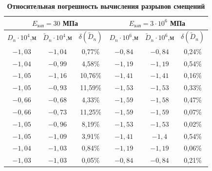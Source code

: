 \begin{table}[b!]

\centering \small 

\setlength{\extrarowheight}{3pt}

\setlength{\tabcolsep}{5pt} 

\caption*{\bf Относительная погрешность вычисления разрывов смещений}

\vspace{-3mm}  \small 

\begin{tabular}{c|c|c|c|c|c}

\hline 

  \multicolumn{3}{c|}{\footnotesize$E_{\text{зaп}}=30$ МПа}  &        \multicolumn{3}{c}{\footnotesize $E_{\text{зaп}}=3\cdot10^6$ МПа}     \\

\hline

\footnotesize $D_{n} \cdot10^4$,м &\footnotesize $\tilde{D}_{n}\cdot10^4$,м & \footnotesize $\delta(\tilde{D}_{n})$ & \footnotesize $D_{n}\cdot10^6$,м& \footnotesize $\tilde{D}_{n}\cdot10^6$,м& \footnotesize $\delta(\tilde{D}_{n})$  \\

\hline 

\rule{0mm}{14pt}%

$-1,03$ & $-1,04$ & 0,77\%  & $-0,84$ & $-0,84$ & 0,24\% \\

$-1,04$ & $-0,99$ & 4,58\%  & $-1,19$ & $-1,19$ & 0,54\% \\

$-1,05$ & $-1,16$ & 10,76\% & $-1,41$ & $-1,41$ & 0,16\% \\

$-1,05$ & $-0,93$ & 11,59\% & $-1,53$ & $-1,53$ & 0,33\% \\

$-0,66$ & $-0,68$ & 4,33\%  & $-1,59$ & $-1,58$ & 0,47\% \\

$-0,66$ & $-0,73$ & 11,25\% & $-1,59$ & $-1,59$ & 0,07\% \\

$-1,05$ & $-0,96$ & 8,19\%  & $-1,53$ & $-1,53$ & 0,02\% \\

$-1,05$ & $-1,09$ & 3,91\%  & $-1,41$ & $-1,4$  & 0,54\% \\

$-1,04$ & $-1,03$ & 0,84\%  & $-1,19$ & $-1,19$ & 0,06\% \\

$-1,03$ & $-1,03$ & 0,05\%  & $-0,84$ & $-0,84$ & 0,21\% \\

\hline

\end{tabular} 

\end{table}



